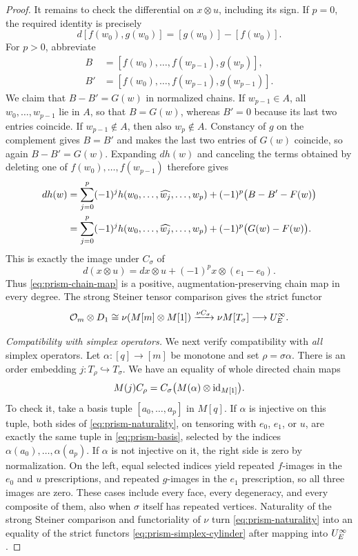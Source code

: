 \begin{proof}
It remains to check the differential on $x\otimes u$, including its
sign.  If $p=0$, the required identity is precisely
\[
 d[f(w_0),g(w_0)]=[g(w_0)]-[f(w_0)].
\]
For $p>0$, abbreviate
\[
 \begin{split}
 B&=[f(w_0),\ldots,f(w_{p-1}),g(w_p)],\\
 B'&=[f(w_0),\ldots,f(w_{p-1}),g(w_{p-1})].
 \end{split}
\]
We claim that $B-B'=G(w)$ in normalized chains.  If
$w_{p-1}\in A$, all $w_0,\ldots,w_{p-1}$ lie in $A$, so that
$B=G(w)$, whereas $B'=0$ because its last two entries coincide.
If $w_{p-1}\notin A$, then also $w_p\notin A$.  Constancy of $g$
on the complement gives $B=B'$ and makes the last two entries of
$G(w)$ coincide, so again $B-B'=G(w)$.
Expanding $dh(w)$ and canceling the terms obtained by deleting one of
$f(w_0),\ldots,f(w_{p-1})$ therefore gives
\begin{align}
 dh(w)
 &=\sum_{j=0}^{p}(-1)^j
     h(w_0,\ldots,\widehat{w_j},\ldots,w_p)
       +(-1)^p\bigl(B-B'-F(w)\bigr)\notag\\
 &=\sum_{j=0}^{p}(-1)^j
     h(w_0,\ldots,\widehat{w_j},\ldots,w_p)
       +(-1)^p\bigl(G(w)-F(w)\bigr).
 \label{eq:prism-boundary}
\end{align}
This is exactly the image under $C_\sigma$ of
\[
 d(x\otimes u)=dx\otimes u+(-1)^p x\otimes(e_1-e_0).
\]
Thus \eqref{eq:prism-chain-map} is a positive,
augmentation-preserving chain map in every degree.  The strong Steiner
tensor comparison gives the strict functor
\begin{equation}\label{eq:prism-simplex-cylinder}
 \mathcal O_{m}\otimes D_{1}
   \cong\nu(M[m]\otimes M[1])
   \xrightarrow{\nu C_\sigma}\nu M[T_\sigma]
   \longrightarrow U^{\infty}_{E}.
\end{equation}

\smallskip\noindent\emph{Compatibility with simplex operators.}
We next verify compatibility with \emph{all} simplex operators.
Let $\alpha:[q]\to[m]$ be monotone and set $\rho=\sigma\alpha$.
There is an order embedding $j:T_\rho\hookrightarrow T_\sigma$.
We have an equality of whole directed chain maps
\begin{equation}\label{eq:prism-naturality}
 M(j)C_\rho=C_\sigma\bigl(M(\alpha)\otimes\mathrm{id}_{M[1]}\bigr).
\end{equation}
To check it, take a basis tuple $[a_0,\ldots,a_p]$ in $M[q]$.
If $\alpha$ is injective on this tuple, both sides of
\eqref{eq:prism-naturality}, on tensoring with $e_0$, $e_1$, or $u$,
are exactly the same tuple in \eqref{eq:prism-basis}, selected by the
indices $\alpha(a_0),\ldots,\alpha(a_p)$.
If $\alpha$ is not injective on it, the right side is zero by
normalization.  On the left, equal selected indices yield repeated
$f$-images in the $e_0$ and $u$ prescriptions, and repeated $g$-images
in the $e_1$ prescription, so all three images are zero.
These cases include every face, every degeneracy, and every composite
of them, also when $\sigma$ itself has repeated vertices.
Naturality of the strong Steiner comparison and functoriality of
$\nu$ turn \eqref{eq:prism-naturality} into an equality of the strict
functors \eqref{eq:prism-simplex-cylinder} after mapping into
$U^{\infty}_{E}$.


\end{proof}
